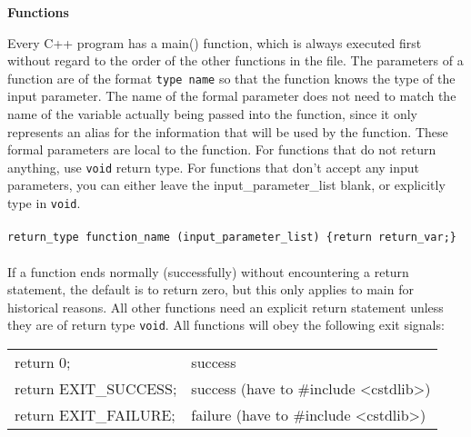 \documentclass[10pt]{article}
\begin{document}
\begin{centering}
\color{blue}\textbf{Functions}\color{black}
\end{centering}
\begin{flushleft}\justify
Every C++ program has a main() function, which is always executed first without regard to the order of the other functions in the file. The parameters of a function are of the format \texttt{type name} so that the function knows the type of the input parameter. The name of the formal parameter does not need to match the name of the variable actually being passed into the function, since it only represents an alias for the information that will be used by the function. These formal parameters are local to the function. For functions that do not return anything, use \texttt{void} return type. For functions that don't accept any input parameters, you can either leave the input\_parameter\_list blank, or explicitly type in \texttt{void}. \\
\\
\color{red}\texttt{return\_type function\_name (input\_parameter\_list) \{return return\_var;\}}\color{black}\\
\\
If a function ends normally (successfully) without encountering a return statement, the default is to return zero, but this only applies to main for historical reasons. All other functions need an explicit return statement unless they are of return type \texttt{void}. All functions will obey the following exit signals:\\

\begin{center}
\begin{tabular}{l l}
return 0; & success\\
return EXIT\_SUCCESS; & success (have to \#include \textless cstdlib\textgreater)\\
return EXIT\_FAILURE; & failure (have to \#include \textless cstdlib\textgreater)\\
\end{tabular}
\end{center}


\end{flushleft}
\end{document}

